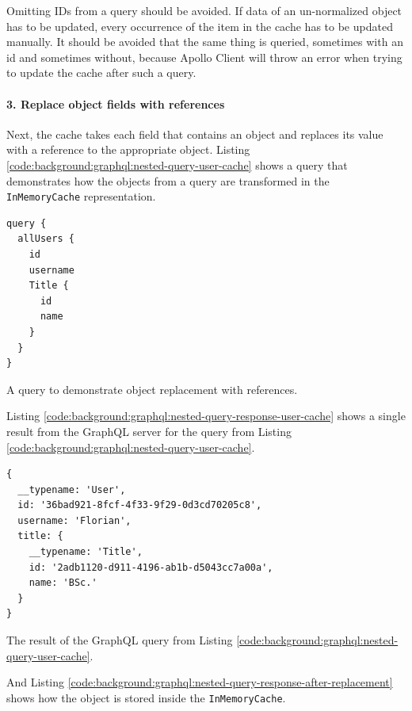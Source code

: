 \noindent Omitting IDs from a query should be avoided. If data of an un-normalized object has to be updated, every occurrence of the item in the cache has to be updated manually. It should be avoided that the same thing is queried, sometimes with an id and sometimes without, because Apollo Client will throw an error when trying to update the cache after such a query.

\paragraph{3. Replace object fields with references}\label{paragraph:background:graphql:apollo-server-client:data-normalization:replace-object-fields-with-references}

Next, the cache takes each field that contains an object and replaces its value with a reference to the appropriate object. Listing \ref{code:background:graphql:nested-query-user-cache} shows a query that demonstrates how the objects from a query are transformed in the \texttt{InMemoryCache} representation.

\ifshowListings
\begin{listing}[H]
    \begin{verbatim}
query {
  allUsers {
    id
    username
    Title {
      id
      name
    }
  }
}
    \end{verbatim}
    \caption{A query to demonstrate object replacement with references.}\label{code:background:graphql:nested-query-user-cache}
\end{listing}
\fi

Listing \ref{code:background:graphql:nested-query-response-user-cache} shows a single result from the GraphQL server for the query from Listing \ref{code:background:graphql:nested-query-user-cache}.

\ifshowListings
\begin{listing}[H]
    \begin{verbatim}
{
  __typename: 'User',
  id: '36bad921-8fcf-4f33-9f29-0d3cd70205c8',
  username: 'Florian',
  title: {
    __typename: 'Title',
    id: '2adb1120-d911-4196-ab1b-d5043cc7a00a',
    name: 'BSc.'
  }
}
    \end{verbatim}
    \caption{The result of the GraphQL query from Listing \ref{code:background:graphql:nested-query-user-cache}.} \label{code:background:graphql:nested-query-response-user-cache}
\end{listing}
\fi

\noindent And Listing \ref{code:background:graphql:nested-query-response-after-replacement} shows how the object is stored inside the \texttt{InMemoryCache}.

